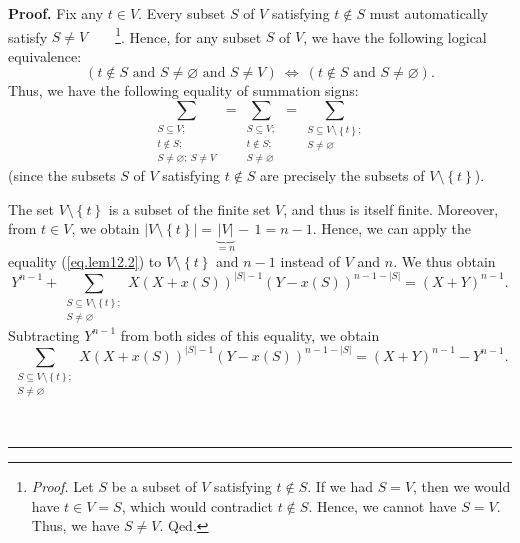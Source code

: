 \documentclass[numbers=enddot,12pt,final,onecolumn,notitlepage]{scrartcl}%
\theoremstyle{definition}
\newenvironment{proof}[1][Proof]{\noindent\textbf{#1.} }{\ \rule{0.5em}{0.5em}}
\let\sumnonlimits\sum
\renewcommand{\sum}{\sumnonlimits\limits}
\newenvironment{verlong}{}{}
\begin{document}
\begin{verlong}
\begin{proof}
Fix any $t\in V$. Every subset $S$ of $V$ satisfying $t\notin S$ must
automatically satisfy $S\neq V$\ \ \ \ \footnote{\textit{Proof.} Let $S$ be a
subset of $V$ satisfying $t\notin S$. If we had $S=V$, then we would have
$t\in V=S$, which would contradict $t\notin S$. Hence, we cannot have $S=V$.
Thus, we have $S\neq V$. Qed.}. Hence, for any subset $S$ of $V$, we have the
following logical equivalence:%
\[
\left(  t\notin S\text{ and }S\neq\varnothing\text{ and }S\neq V\right)
\ \Longleftrightarrow\ \left(  t\notin S\text{ and }S\neq\varnothing\right)
.
\]
Thus, we have the following equality of summation signs:%
\begin{equation}
\sum_{\substack{S\subseteq V;\\t\notin S;\\S\neq\varnothing;\ S\neq V}%
}=\sum_{\substack{S\subseteq V;\\t\notin S;\\S\neq\varnothing}}=\sum
_{\substack{S\subseteq V\setminus\left\{  t\right\}  ;\\S\neq\varnothing}}
\label{pf.lem.4.sumeq1}%
\end{equation}
(since the subsets $S$ of $V$ satisfying $t\notin S$ are precisely the subsets
of $V\setminus\left\{  t\right\}  $).

The set $V\setminus\left\{  t\right\}  $ is a subset of the finite set $V$,
and thus is itself finite. Moreover, from $t\in V$, we obtain $\left\vert
V\setminus\left\{  t\right\}  \right\vert =\underbrace{\left\vert V\right\vert
}_{=n}-\,1=n-1$. Hence, we can apply the equality (\ref{eq.lem12.2}) to
$V\setminus\left\{  t\right\}  $ and $n-1$ instead of $V$ and $n$. We thus
obtain%
\[
Y^{n-1}+\sum_{\substack{S\subseteq V\setminus\left\{  t\right\}
;\\S\neq\varnothing}}X\left(  X+x\left(  S\right)  \right)  ^{\left\vert
S\right\vert -1}\left(  Y-x\left(  S\right)  \right)  ^{n-1-\left\vert
S\right\vert }=\left(  X+Y\right)  ^{n-1}.
\]
Subtracting $Y^{n-1}$ from both sides of this equality, we obtain%
\begin{equation}
\sum_{\substack{S\subseteq V\setminus\left\{  t\right\}  ;\\S\neq\varnothing
}}X\left(  X+x\left(  S\right)  \right)  ^{\left\vert S\right\vert -1}\left(
Y-x\left(  S\right)  \right)  ^{n-1-\left\vert S\right\vert }=\left(
X+Y\right)  ^{n-1}-Y^{n-1}. \label{pf.lem.4.t-eq0}%
\end{equation}



\end{proof}
\end{verlong}
\end{document}
